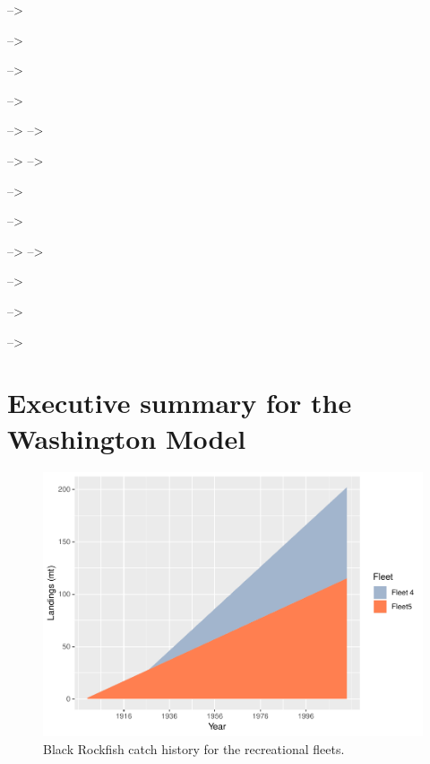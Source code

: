 \documentclass[12pt,]{article}
\begin{document}
\FloatBarrier

--\textgreater{}

--\textgreater{}

--\textgreater{}

--\textgreater{}

--\textgreater{} --\textgreater{}

--\textgreater{} --\textgreater{}

--\textgreater{}

--\textgreater{}

--\textgreater{} --\textgreater{}

--\textgreater{}

--\textgreater{}

--\textgreater{}

\section*{Executive summary for the Washington
Model}\label{executive-summary-for-the-washington-model}

\FloatBarrier

\begin{figure}[htbp]
\centering
\includegraphics{00_Assessment_Compile_files/figure-latex/unnamed-chunk-16-1.pdf}
\caption{Black Rockfish catch history for the recreational fleets.
\label{fig:Exec_catch3}}
\end{figure}

\FloatBarrier
\end{document}
